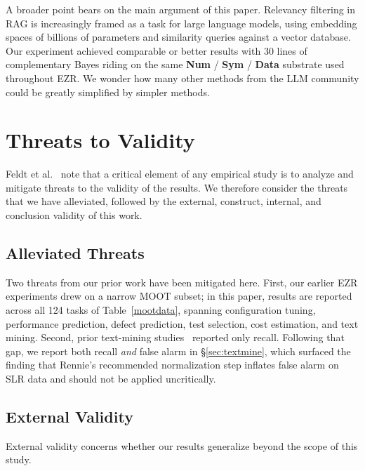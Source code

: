 \documentclass[AMA,STIX2COL]{WileyNJDv5}
\newcommand{\IT}{{\sffamily EZR}}
\newcommand{\cls}[1]{%
  \setlength{\fboxsep}{1.5pt}%
  \colorbox{clsbg}{\sffamily\bfseries{#1}}%
}
\begin{document}
{A broader point bears on the main argument of this paper.
Relevancy filtering in RAG is increasingly framed as a task for large
language models, using embedding spaces of billions of
parameters and similarity queries against a vector database.
Our experiment achieved comparable or better results with 30
lines of complementary Bayes riding on the same
\cls{Num}/\cls{Sym}/\cls{Data} substrate used throughout
EZR. We wonder how many other methods from the LLM community could be greatly simplified by simpler methods.




\section{Threats to Validity}\label{sec:ttv}
Feldt et al.~\cite{feldt2010validity} note that a critical
element of any empirical study is to analyze and mitigate
threats to the validity of the results. We therefore consider
the threats that we have alleviated, followed by the external,
construct, internal, and conclusion validity of this work.

\subsection{Alleviated Threats}
Two threats from our prior work have been mitigated here.
First, our earlier \IT{} experiments drew on a narrow MOOT
subset; in this paper, results are reported across all 124
tasks of Table~\ref{mootdata}, spanning configuration tuning,
performance prediction, defect prediction, test selection,
cost estimation, and text mining. Second, prior text-mining
studies~\cite{yu2018total} reported only recall. Following
that gap, we report both recall {\em and} false alarm in
\S\ref{sec:textmine}, which surfaced the finding that
Rennie's recommended normalization step
\cite{rennie2003tackling} inflates false alarm on SLR data
and should not be applied uncritically.

\subsection{External Validity}
External validity concerns whether our results generalize
beyond the scope of this study.

}
\end{document}
